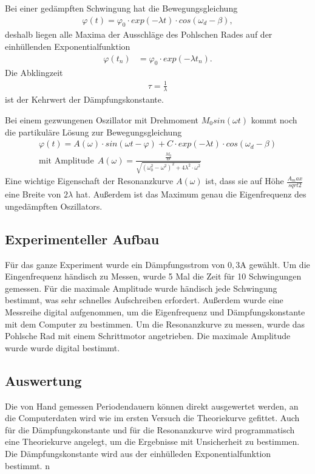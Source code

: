 \documentclass[11pt, a4paper]{article}
\begin{document}
    Bei einer gedämpften Schwingung hat die Bewegungsgleichung
    \begin{align}
        \varphi(t) = \varphi_0 \cdot exp(-\lambda t) \cdot cos(\omega_d - \beta), \label{theo5}
    \end{align}
    deshalb liegen alle Maxima der Ausschläge des Pohlschen Rades auf der einhüllenden Exponentialfunktion
    \begin{align}
        \varphi(t_n) &= \varphi_0 \cdot exp(-\lambda t_n).
    \end{align}
    Die Abklingzeit
    \begin{align}
        \tau = \frac{1}{\lambda}
    \end{align}
    ist der Kehrwert der Dämpfungskonstante.

    Bei einem gezwungenen Oszillator mit Drehmoment $M_0 sin(\omega t)$ kommt noch die partikuläre Lösung zur Bewegungsgleichung
    \begin{align}
        \varphi(t) = A(\omega) \cdot sin(\omega t - \varphi) + C \cdot exp(-\lambda t) \cdot cos(\omega_d - \beta) \\
        \text{mit Amplitude}  \ \ A(\omega) = \frac{\frac{M_0}{\Theta}}{\sqrt{\left( \omega_0^2 - \omega^2 \right)^2 + 4 \lambda^2 \cdot \omega^2}} \label{aomega}
    \end{align}
    Eine wichtige Eigenschaft der Resonanzkurve $A(\omega)$ ist, dass sie auf Höhe $\frac{A_max}{sqrt{2}}$ eine Breite von $2\lambda$ hat.
    Außerdem ist das Maximum genau die Eigenfrequenz des ungedämpften Oszillators.

    \subsection{Experimenteller Aufbau}
    Für das ganze Experiment wurde ein Dämpfungsstrom von $0,3 \si{\ampere}$ gewählt.
    Um die Eingenfrequenz händisch zu Messen, wurde 5 Mal die Zeit für 10 Schwingungen gemessen.
    Für die maximale Amplitude wurde händisch jede Schwingung bestimmt, was sehr schnelles Aufschreiben erfordert.
    Außerdem wurde eine Messreihe digital aufgenommen, um die Eigenfrequenz und Dämpfungskonstante mit dem Computer zu bestimmen.
    Um die Resonanzkurve zu  messen, wurde das Pohlsche Rad mit einem Schrittmotor angetrieben. Die maximale Amplitude wurde
    wurde digital bestimmt.

    \subsection{Auswertung}
    Die von Hand gemessen Periodendauern können direkt ausgewertet werden, an die Computerdaten
    wird wie im ersten Versuch die Theoriekurve gefittet. Auch für die Dämpfungskonstante und für die
    Resonanzkurve wird programmatisch eine Theoriekurve angelegt, um die Ergebnisse mit Unsicherheit
    zu bestimmen. Die Dämpfungskonstante wird aus der einhülleden Exponentialfunktion bestimmt.
n
\end{document}
